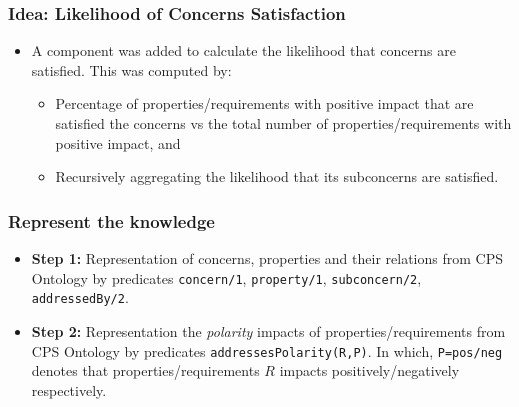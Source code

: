 \documentclass{beamer}
\begin{document}
\begin{frame}[fragile]
	\frametitle{Idea: Likelihood of Concerns Satisfaction}
	\begin{itemize}
		\item A component was added to calculate the likelihood that concerns are satisfied. This was computed by:
		\begin{itemize}
			\item Percentage of properties/requirements with positive impact that are satisfied the concerns vs the total number of properties/requirements with positive impact, and
			\item Recursively aggregating the likelihood that its subconcerns are satisfied.
		\end{itemize}	
	\end{itemize}
\end{frame}

\begin{frame}[fragile]
	\frametitle{Represent the knowledge}
	\begin{itemize}
		\item {\bf Step 1:} Representation of concerns, properties and their relations from CPS Ontology by predicates {\tt concern/1}, {\tt property/1}, {\tt subconcern/2}, {\tt addressedBy/2}.  
		\item {\bf Step 2:} Representation the \emph{polarity} impacts of properties/requirements from CPS Ontology by predicates {\tt addressesPolarity(R,P)}. In which, {\tt P=pos/neg} denotes that properties/requirements $R$ impacts positively/negatively respectively. 
	\end{itemize}
\end{frame}

%
        
\end{document}
